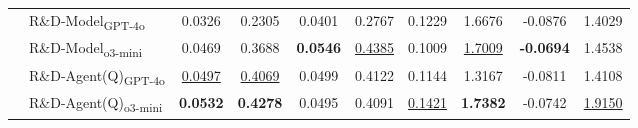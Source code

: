 \begin{table}[h]
{\begin{tabular}{llcccccccc}
& R\&D-Model\textsubscript{GPT-4o} & \cellcolor{average}0.0326 & \cellcolor{poor}0.2305 & \cellcolor{poor}0.0401 & \cellcolor{worse}0.2767 & \cellcolor{good}0.1229 & \cellcolor{good}1.6676 & \cellcolor{average}-0.0876 & \cellcolor{good}1.4029 \\
& R\&D-Model\textsubscript{o3-mini} & \cellcolor{good}0.0469 & \cellcolor{good}0.3688 & \cellcolor{top1}\textbf{0.0546} & \cellcolor{top2}\uline{0.4385} & \cellcolor{good}0.1009 & \cellcolor{top2}\uline{1.7009} & \cellcolor{top1}\textbf{-0.0694} & \cellcolor{good}1.4538 \\
\cmidrule(lr){2-10}
& R\&D-Agent(Q)\textsubscript{GPT-4o} & \cellcolor{top2}\uline{0.0497} & \cellcolor{top2}\uline{0.4069} & \cellcolor{good}0.0499 & \cellcolor{good}0.4122 & \cellcolor{good}0.1144 & \cellcolor{good}1.3167 & \cellcolor{good}-0.0811 & \cellcolor{good}1.4108 \\
& R\&D-Agent(Q)\textsubscript{o3-mini} & \cellcolor{top1}\textbf{0.0532} & \cellcolor{top1}\textbf{0.4278} & \cellcolor{good}0.0495 & \cellcolor{good}0.4091 & \cellcolor{top2}\uline{0.1421} & \cellcolor{top1}\textbf{1.7382} & \cellcolor{good}-0.0742 & \cellcolor{top2}\uline{1.9150} \\
\bottomrule
\end{tabular}
}
\end{table}
